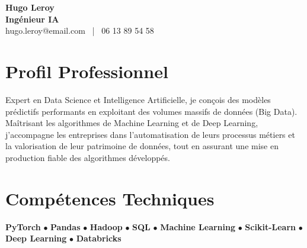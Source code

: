 \documentclass[11pt,a4paper]{article}
\begin{document}
\begin{center}
    {\Huge \textbf{Hugo Leroy}} \\[0.2cm]
    {\Large \textbf{Ingénieur IA}} \\[0.1cm]
    hugo.leroy@email.com \ | \ 06 13 89 54 58
\end{center}

\vspace{0.3cm}

\section*{Profil Professionnel}
\noindent
Expert en Data Science et Intelligence Artificielle, je conçois des modèles prédictifs performants en exploitant des volumes massifs de données (Big Data). Maîtrisant les algorithmes de Machine Learning et de Deep Learning, j'accompagne les entreprises dans l'automatisation de leurs processus métiers et la valorisation de leur patrimoine de données, tout en assurant une mise en production fiable des algorithmes développés.

\vspace{0.3cm}

\section*{Compétences Techniques}
\noindent
\textbf{PyTorch} $\bullet$ \textbf{Pandas} $\bullet$ \textbf{Hadoop} $\bullet$ \textbf{SQL} $\bullet$ \textbf{Machine Learning} $\bullet$ \textbf{Scikit-Learn} $\bullet$ \textbf{Deep Learning} $\bullet$ \textbf{Databricks}

\vspace{0.3cm}

\end{document}
